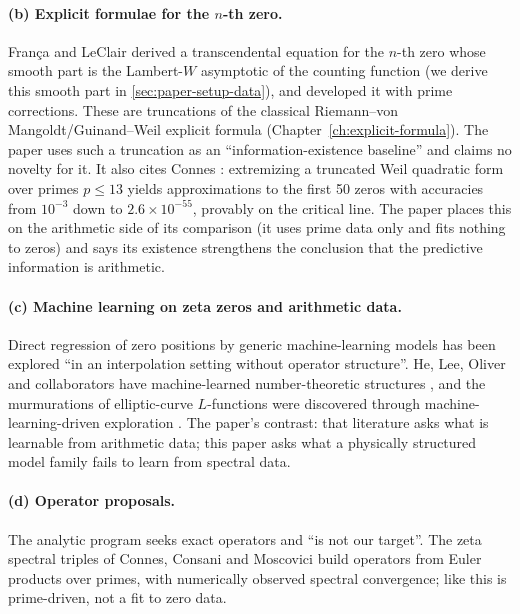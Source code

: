 \paragraph{(b) Explicit formulae for the $n$-th zero.} Fran\c{c}a and LeClair \cite{francaleclair,leclair} derived a transcendental equation for the $n$-th zero whose smooth part is the Lambert-$W$ asymptotic of the counting function (we derive this smooth part in \cref{sec:paper-setup-data}), and developed it with prime corrections. These are truncations of the classical Riemann--von Mangoldt/Guinand--Weil explicit formula (Chapter~\ref{ch:explicit-formula}). The paper uses such a truncation as an ``information-existence baseline'' and claims no novelty for it. It also cites Connes \cite{connes26}: extremizing a truncated Weil quadratic form over primes $p\le13$ yields approximations to the first 50 zeros with accuracies from $10^{-3}$ down to $2.6\times10^{-55}$, provably on the critical line. The paper places this on the arithmetic side of its comparison (it uses prime data only and fits nothing to zeros) and says its existence strengthens the conclusion that the predictive information is arithmetic.

\paragraph{(c) Machine learning on zeta zeros and arithmetic data.} Direct regression of zero positions by generic machine-learning models has been explored \cite{sdsu} ``in an interpolation setting without operator structure''. He, Lee, Oliver and collaborators have machine-learned number-theoretic structures \cite{henumberfields,vanishingorder}, and the murmurations of elliptic-curve $L$-functions were discovered through machine-learning-driven exploration \cite{murmurations}. The paper's contrast: that literature asks what is learnable from arithmetic data; this paper asks what a physically structured model family fails to learn from spectral data.

\paragraph{(d) Operator proposals.} The analytic program \cite{berrykeating99,connes,bbm,sierra,recenthp1,recenthp2,zetatriples} seeks exact operators and ``is not our target''. The zeta spectral triples of Connes, Consani and Moscovici \cite{zetatriples} build operators from Euler products over primes, with numerically observed spectral convergence; like \cite{connes26} this is prime-driven, not a fit to zero data.

